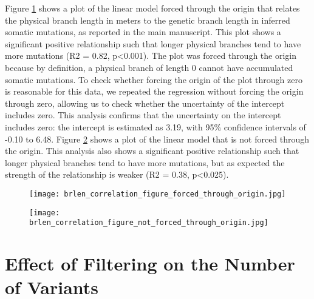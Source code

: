 Figure \ref{fig:supp_brlen_origin} shows a plot of the linear model forced through the origin that relates the physical branch length in meters to the genetic branch length in inferred somatic mutations, as reported in the main manuscript. This plot shows a significant positive relationship such that longer physical branches tend to have more mutations (R2 = 0.82, p<0.001). The plot was forced through the origin because by definition, a physical branch of length 0 cannot have accumulated somatic mutations. To check whether forcing the origin of the plot through zero is reasonable for this data, we repeated the regression without forcing the origin through zero, allowing us to check whether the uncertainty of the intercept includes zero. This analysis confirms that the uncertainty on the intercept includes zero: the intercept is estimated as 3.19, with 95\% confidence intervals of -0.10 to 6.48. Figure \ref{fig:supp_brlen_noorigin} shows a plot of the linear model that is not forced through the origin. This analysis also shows a significant positive relationship such that longer physical branches tend to have more mutations, but as expected the strength of the relationship is weaker (R2 = 0.38, p<0.025).

\begin{figure}
\centering
\texttt{[image: brlen\_correlation\_figure\_forced\_through\_origin.jpg]}
\label{fig:supp_brlen_origin}
\end{figure}

\begin{figure}
\centering
\texttt{[image: brlen\_correlation\_figure\_not\_forced\_through\_origin.jpg]}
\label{fig:supp_brlen_noorigin}
\end{figure}

\section{Effect of Filtering on the Number of Variants}

